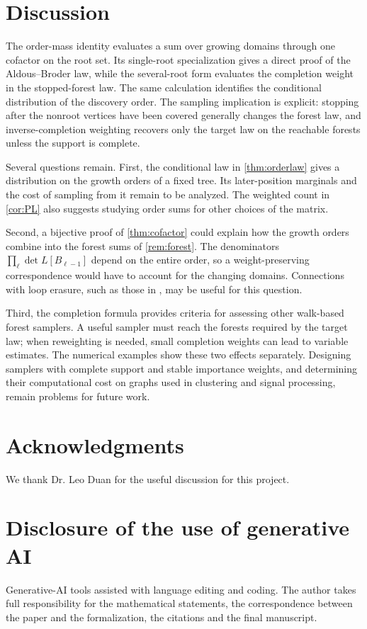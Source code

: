 \documentclass[onefignum,onetabnum,nohypdvips]{siamart250211}
\numberwithin{theorem}{section}
\numberwithin{equation}{section}
\begin{document}
\section{Discussion}\label{sec:discussion}

The order-mass identity evaluates a sum over growing domains through
one cofactor on the root set. Its single-root specialization gives a
direct proof of the Aldous--Broder law, while the several-root form
evaluates the completion weight in the stopped-forest law. The same
calculation identifies the conditional distribution of the discovery
order. The sampling implication is explicit: stopping after the
nonroot vertices have been covered generally changes the forest law,
and inverse-completion weighting recovers only the target law on the
reachable forests unless the support is complete.

Several questions remain. First, the conditional law in
\cref{thm:orderlaw} gives a distribution on the growth orders of a
fixed tree. Its later-position marginals and the cost of sampling
from it remain to be analyzed. The weighted count in \cref{cor:PL}
also suggests studying order sums for other choices of the matrix.

Second, a bijective proof of \cref{thm:cofactor} could explain how
the growth orders combine into the forest sums of \cref{rem:forest}.
The denominators $\prod_\ell\det L[B_{\ell-1}]$ depend on the entire
order, so a weight-preserving correspondence would have to account
for the changing domains. Connections with loop erasure, such as
those in \cite{Fomin2001}, may be useful for this question.

Third, the completion formula provides criteria for assessing other
walk-based forest samplers. A useful sampler must reach the forests
required by the target law; when reweighting is needed, small
completion weights can lead to variable estimates. The numerical
examples show these two effects separately. Designing samplers with
complete support and stable importance weights, and determining
their computational cost on graphs used in clustering and signal
processing, remain problems for future work.


\section*{Acknowledgments}
We thank Dr. Leo Duan for the useful discussion for this project.

\section*{Disclosure of the use of generative AI}
Generative-AI tools assisted with language editing and coding. The author takes full
responsibility for the mathematical statements, the correspondence
between the paper and the formalization, the citations and the final
manuscript.
\end{document}
